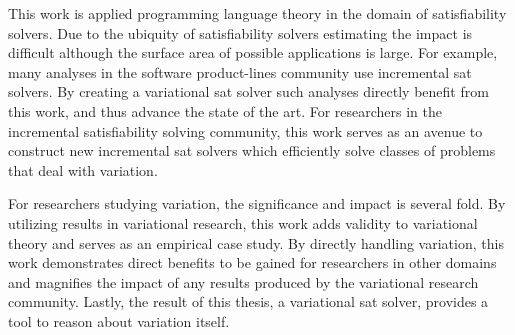 This work is applied programming language theory in the domain of satisfiability
solvers. Due to the ubiquity of satisfiability solvers estimating the impact is
difficult although the surface area of possible applications is large. For
example, many analyses in the software product-lines community use incremental
\ac{sat} solvers. By creating a variational \ac{sat} solver such analyses
directly benefit from this work, and thus advance the state of the art. For
researchers in the incremental satisfiability solving community, this work
serves as an avenue to construct new incremental \ac{sat} solvers which
efficiently solve classes of problems that deal with variation.

For researchers studying variation, the significance and impact is several fold.
By utilizing results in variational research, this work adds validity to
variational theory and serves as an empirical case study. By directly handling
variation, this work demonstrates direct benefits to be gained for researchers
in other domains and magnifies the impact of any results produced by the
variational research community. Lastly, the result of this thesis, a variational
\ac{sat} solver, provides a tool to reason about variation itself.

